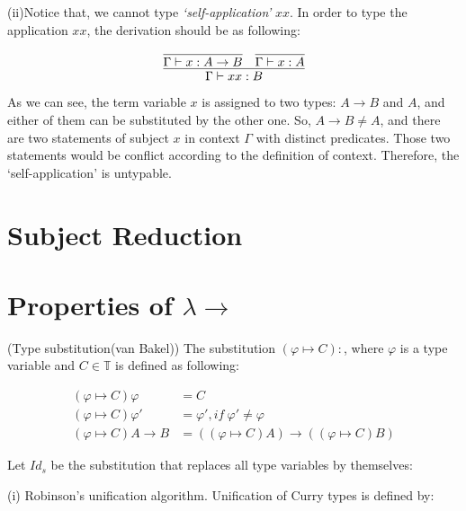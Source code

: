 (ii)Notice that, we cannot type \textit{`self-application'} $xx$. In order to type the application $xx$, the derivation should be as following:

$$
\infer{\Gamma \vdash xx:B}{
    \infer{\Gamma \vdash x:A \rightarrow B}{} 
    &
    \infer{\Gamma \vdash x:A}{}
}
$$


As we can see, the term variable $x$ is assigned to two types: $A \rightarrow B$ and $A$, and either of them can be substituted by the other one. So, $A \rightarrow B \neq A$, and there are two statements of subject $x$ in context $\Gamma$ with distinct predicates. Those two statements would be conflict according to the definition of context. Therefore, the `self-application' is untypable. 



\section{Subject Reduction}

\section{Properties of $\lambda \rightarrow $}

\begin{def1}{\label{def:tsub}}
\normalfont (Type substitution(van Bakel\cite{svb2001type})) The substitution $(\varphi \mapsto C): $, where $\varphi$ is a type variable and $C \in \mathbb{T}$ is defined as following:
\end{def1}

\begin{equation*}
\begin{array}{ll}
(\varphi \mapsto C)\varphi        & = C\\
(\varphi \mapsto C)\varphi '      & = \varphi ',if\ \varphi '\neq \varphi\\
(\varphi \mapsto C)A\rightarrow B & = ((\varphi \mapsto C)A)\rightarrow ((\varphi \mapsto C)B)
\end{array}
\end{equation*}


\begin{def1}\label{eq:rob}
\normalfont Let $Id_s$ be the substitution that replaces all type variables by themselves:
\end{def1}

\noindent (i) Robinson's unification algorithm. Unification of Curry types is defined by:


